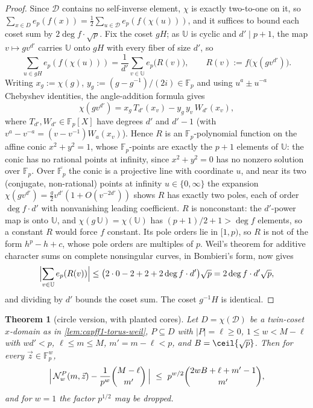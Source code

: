 \documentclass[11pt]{article}
\newtheorem{theorem}{Theorem}[section]
\theoremstyle{definition}
\theoremstyle{remark}
\newcommand{\F}{\mathbb{F}}
\newcommand{\UU}{\mathbb{U}}
\begin{document}
\begin{proof}
Since $\mathcal D$ contains no self-inverse element, $\chi$ is exactly two-to-one on it, so $\sum_{x\in D}e_p(f(x))=\tfrac12\sum_{u\in\mathcal D}e_p(f(\chi(u)))$, and it suffices to bound each coset sum by $2\deg f\cdot\sqrt p$.  Fix the coset $gH$; as $\UU$ is cyclic and $d'\mid p+1$, the map $v\mapsto gv^{d'}$ carries $\UU$ onto $gH$ with every fiber of size $d'$, so
\[
        \sum_{u\in gH}e_p(f(\chi(u)))=\frac1{d'}\sum_{v\in\UU}e_p\bigl(R(v)\bigr),\qquad R(v):=f\bigl(\chi(gv^{d'})\bigr).
\]
Writing $x_g:=\chi(g)$, $y_g:=(g-g^{-1})/(2i)\in\F_p$ and using $u^{a}\pm u^{-a}$ Chebyshev identities, the angle-addition formula gives
\[
        \chi(gv^{d'})=x_g\,T_{d'}(x_v)-y_g\,y_v\,W_{d'}(x_v),
\]
where $T_{d'},W_{d'}\in\F_p[X]$ have degrees $d'$ and $d'-1$ \textup{(with $v^{a}-v^{-a}=(v-v^{-1})W_a(x_v)$)}.  Hence $R$ is an $\F_p$-polynomial function on the affine conic $x^2+y^2=1$, whose $\F_p$-points are exactly the $p+1$ elements of $\UU$: the conic has no rational points at infinity, since $x^2+y^2=0$ has no nonzero solution over $\F_p$.  Over $\overline{\F_p}$ the conic is a projective line with coordinate $u$, and near its two \textup{(conjugate, non-rational)} points at infinity $u\in\{0,\infty\}$ the expansion $\chi(gv^{d'})=\tfrac g2v^{d'}(1+O(v^{-2d'}))$ shows $R$ has exactly two poles, each of order $\deg f\cdot d'$ with nonvanishing leading coefficient.  $R$ is nonconstant: the $d'$-power map is onto $\UU$, and $\chi(g\,\UU)=\chi(\UU)$ has $(p+1)/2+1>\deg f$ elements, so a constant $R$ would force $f$ constant.  Its pole orders lie in $[1,p)$, so $R$ is not of the form $h^p-h+c$, whose pole orders are multiples of $p$.  Weil's theorem for additive character sums on complete nonsingular curves, in Bombieri's form, now gives
\[
        \Bigl|\sum_{v\in\UU}e_p(R(v))\Bigr|\le\bigl(2\cdot0-2+2+2\deg f\cdot d'\bigr)\sqrt p=2\deg f\cdot d'\sqrt p,
\]
and dividing by $d'$ bounds the coset sum.  The coset $g^{-1}H$ is identical.
\end{proof}

\begin{theorem}[circle version, with planted cores]\label{thm:capff1-collision-circle}
Let $D=\chi(\mathcal D)$ be a twin-coset $x$-domain as in \cref{lem:capff1-torus-weil}, $P\subseteq D$ with $|P|=\ell\ge0$, $1\le w<M-\ell$ with $wd'<p$, $\ell\le m\le M$, $m'=m-\ell<p$, and $B=\ceil{\sqrt p}$.  Then for every $\vec z\in\F_p^w$,
\[
        \Bigl|\,\mathcal N_w^P(m,\vec z)-\frac1{p^w}\binom{M-\ell}{m'}\,\Bigr|
        \ \le\ p^{w/2}\binom{2wB+\ell+m'-1}{m'},
\]
and for $w=1$ the factor $p^{1/2}$ may be dropped.
\end{theorem}
\end{document}
